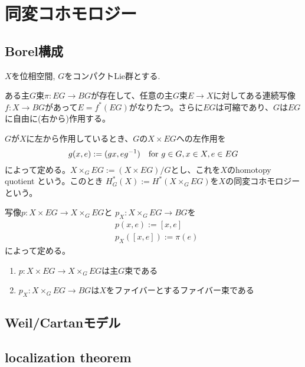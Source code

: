 \section{同変コホモロジー}
\subsection{Borel構成}

$X$を位相空間, $G$をコンパクトLie群とする.

\begin{fact}
  ある主$G$束$\pi:EG\rightarrow BG$が存在して、任意の主$G$束$E\rightarrow X$に対してある連続写像$f:X\rightarrow BG$があって$E=f^*(EG)$がなりたつ。さらに$EG$は可縮であり、$G$は$EG$に自由に(右から)作用する。
\end{fact}

\begin{defin}
  $G$が$X$に左から作用しているとき、$G$の$X\times EG$への左作用を
  \[
  g(x, e) := (gx, eg^{-1}) \quad \text{for } g\in G, x\in X, e\in EG 
  \]
  によって定める。$X\times_GEG:=(X\times EG)/G$とし、これを$X$のhomotopy quotient という。このとき
  $H^*_G(X):=H^*(X\times_GEG)$を$X$の同変コホモロジーという。
\end{defin}

写像$p:X\times EG\rightarrow X\times_GEG$と $p_X:X\times_GEG\rightarrow BG$を
\begin{align*}
  &p(x, e):=[x,e]\\
  &p_X([x,e]):=\pi(e)
\end{align*}
によって定める。

\begin{prop}
  \:
  \begin{enumerate}
    \item $p:X\times EG\rightarrow X\times_GEG$は主$G$束である
    \item $p_X:X\times_GEG\rightarrow BG$は$X$をファイバーとするファイバー束である
  \end{enumerate}
\end{prop}


\subsection{Weil/Cartanモデル}

\subsection{localization theorem}
